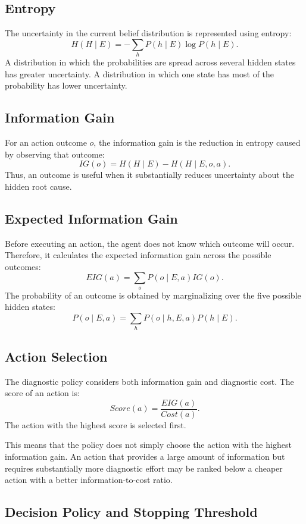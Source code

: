 \documentclass{article}
\begin{document}
\subsection{Entropy}

The uncertainty in the current belief distribution is represented using entropy:
\[
H(H\mid E) = -\sum_h P(h\mid E)\log P(h\mid E).
\]
A distribution in which the probabilities are spread across several hidden states has greater uncertainty. A distribution in which one state has most of the probability has lower uncertainty.

\subsection{Information Gain}

For an action outcome $o$, the information gain is the reduction in entropy caused by observing that outcome:
\[
IG(o) = H(H\mid E) - H(H\mid E,o,a).
\]
Thus, an outcome is useful when it substantially reduces uncertainty about the hidden root cause.

\subsection{Expected Information Gain}

Before executing an action, the agent does not know which outcome will occur. Therefore, it calculates the expected information gain across the possible outcomes:
\[
EIG(a) = \sum_o P(o\mid E,a)IG(o).
\]
The probability of an outcome is obtained by marginalizing over the five possible hidden states:
\[
P(o\mid E,a) = \sum_h P(o\mid h,E,a)P(h\mid E).
\]

\subsection{Action Selection}

The diagnostic policy considers both information gain and diagnostic cost. The score of an action is:
\[
Score(a) = \frac{EIG(a)}{Cost(a)}.
\]
The action with the highest score is selected first.

This means that the policy does not simply choose the action with the highest information gain. An action that provides a large amount of information but requires substantially more diagnostic effort may be ranked below a cheaper action with a better information-to-cost ratio.

\subsection{Decision Policy and Stopping Threshold}
\end{document}
